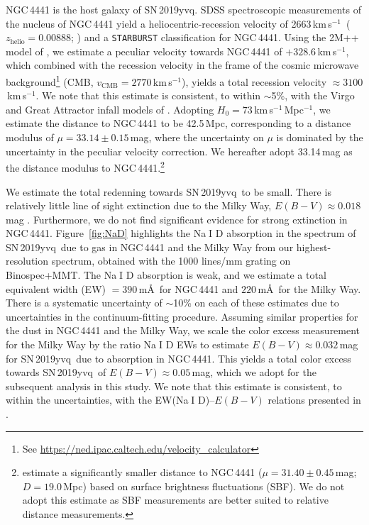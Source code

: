 \documentclass[twocolumn]{aastex63}
\def\ion#1#2{#1$\;${\footnotesize\rm{#2}}\relax}
\newcommand{\kms}{km\,s$^{-1}$}
\newcommand{\sn}{SN\,2019yvq}
\begin{document}
NGC\,4441 is the host galaxy of \sn. SDSS spectroscopic measurements of the
nucleus of NGC\,4441 yield a heliocentric-recession velocity of 2663\,\kms\
($z_\mathrm{helio} = 0.00888$; \citealt{Abolfathi18}) and a
\texttt{STARBURST} classification for NGC\,4441. Using the 2M++ model of
\citet{Carrick15}, we estimate a peculiar velocity towards NGC\,4441 of
$+328.6$\,\kms, which combined with the recession velocity in the frame of
the cosmic microwave background\footnote{See
\url{https://ned.ipac.caltech.edu/velocity_calculator}} (CMB, $v_\mathrm{CMB}
= 2770$\,\kms), yields a total recession velocity $\approx 3100$\,\kms. We
note that this estimate is consistent, to within $\sim$5\%, with the Virgo
and Great Attractor infall models of \citet{Mould00}. Adopting $H_0 =
73$\,\kms\,Mpc$^{-1}$, we estimate the distance to NGC\,4441 to be 42.5\,Mpc,
corresponding to a distance modulus of $\mu = 33.14 \pm 0.15$\,mag, where the
uncertainty on $\mu$ is dominated by the uncertainty in the peculiar velocity
correction. We hereafter adopt 33.14\,mag as the distance modulus to
NGC\,4441.\footnote{\citet{Tonry01} estimate a significantly smaller distance
to NGC\,4441 ($\mu = 31.40 \pm 0.45$\,mag; $D = 19.0$\,Mpc) based on surface
brightness fluctuations (SBF). We do not adopt this estimate as SBF
measurements are better suited to relative distance measurements.}


We estimate the total redenning towards \sn\ to be small. There is relatively
little line of sight extinction due to the Milky Way, $E(B-V) \approx
0.018$\,mag \citep{Schlafly11}. Furthermore, we do not find significant
evidence for strong extinction in NGC\,4441. Figure~\ref{fig:NaD} highlights
the \ion{Na}{I} D absorption in the spectrum of \sn\ due to gas in NGC\,4441
and the Milky Way from our highest-resolution spectrum, obtained with the
1000 lines/mm grating on Binospec+MMT. The \ion{Na}{I} D absorption is weak,
and we estimate a total equivalent width (EW) $= 390$\,m\AA\ for NGC\,4441
and $220$\,m\AA\ for the Milky Way. There is a systematic uncertainty of
$\sim$10\% on each of these estimates due to uncertainties in the
continuum-fitting procedure. Assuming similar properties for the dust in
NGC\,4441 and the Milky Way, we scale the color excess measurement for the
Milky Way by the ratio \ion{Na}{I} D EWs to estimate $E(B-V) \approx
0.032$\,mag for \sn\ due to absorption in NGC\,4441. This yields a total
color excess towards \sn\ of $E(B-V) \approx 0.05$\,mag, which we adopt for
the subsequent analysis in this study. We note that this estimate is
consistent, to within the uncertainties, with the EW(\ion{Na}{I} D)--$E(B-V)$
relations presented in \citet{Poznanski12}.
\end{document}
